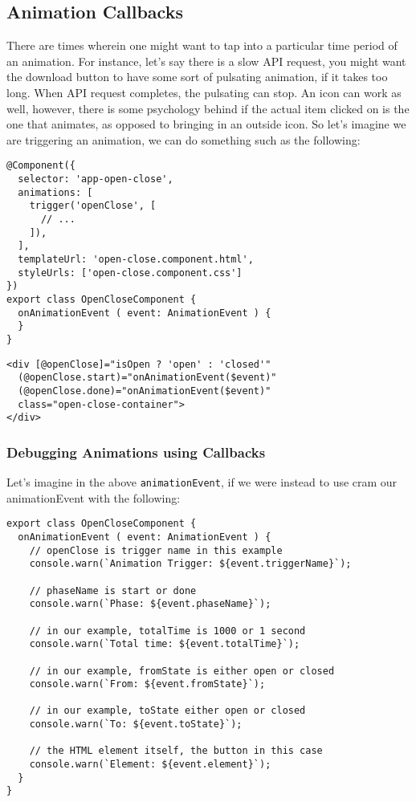 
\subsection{ Animation Callbacks }
There are times wherein one might want to tap into a particular time period of
an animation. For instance, let's say there is a slow API request, you might 
want the download button to have some sort of pulsating animation, if it takes
too long. When API request completes, the pulsating can stop. An icon can work 
as well, however, there is some psychology behind if the actual item clicked 
on is the one that animates, as opposed to bringing in an outside icon. So 
let's imagine we are triggering an animation, we can do something such as 
the following: 
\begin{lstlisting}[caption=open-close.component.ts]
@Component({
  selector: 'app-open-close',
  animations: [
    trigger('openClose', [
      // ...
    ]),
  ],
  templateUrl: 'open-close.component.html',
  styleUrls: ['open-close.component.css']
})
export class OpenCloseComponent {
  onAnimationEvent ( event: AnimationEvent ) {
  }
}  
\end{lstlisting}

\begin{lstlisting}[caption=open-close.component.html]
<div [@openClose]="isOpen ? 'open' : 'closed'"
  (@openClose.start)="onAnimationEvent($event)"
  (@openClose.done)="onAnimationEvent($event)"
  class="open-close-container">
</div>
\end{lstlisting}

\subsubsection{ Debugging Animations using Callbacks }
Let's imagine in the above \lstinline{animationEvent}, if we were instead to
use cram our animationEvent with the following: 
\begin{lstlisting}[caption=open-close.component.ts]
export class OpenCloseComponent {
  onAnimationEvent ( event: AnimationEvent ) {
    // openClose is trigger name in this example
    console.warn(`Animation Trigger: ${event.triggerName}`);

    // phaseName is start or done
    console.warn(`Phase: ${event.phaseName}`);

    // in our example, totalTime is 1000 or 1 second
    console.warn(`Total time: ${event.totalTime}`);

    // in our example, fromState is either open or closed
    console.warn(`From: ${event.fromState}`);

    // in our example, toState either open or closed
    console.warn(`To: ${event.toState}`);

    // the HTML element itself, the button in this case
    console.warn(`Element: ${event.element}`);
  }
}  
\end{lstlisting}

